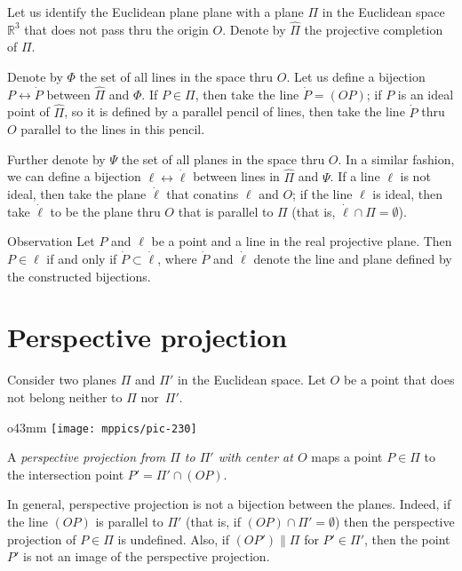 Let us identify the Euclidean plane plane with a plane $\Pi$ in the Euclidean space $\mathbb{R}^3$ that does not pass thru the origin $O$.
Denote by $\hat\Pi$ the projective completion of $\Pi$.

Denote by $\Phi$ the set of all lines in the space thru $O$.
Let us define a bijection $P\leftrightarrow \dot P$ between $\hat \Pi$ and $\Phi$.
If $P\in \Pi$, then take the line $\dot P=(OP)$;
if $P$ is an ideal point of $\hat \Pi$, so it is defined by a parallel pencil of lines, then take the line $\dot P$ thru $O$ parallel to the lines in this pencil.

Further denote by $\Psi$ the set of all planes in the space thru $O$.
In a similar fashion, we can define a bijection $\ell\leftrightarrow \dot \ell$ between lines in $\hat \Pi$ and $\Psi$.
If a line $\ell$ is not ideal, then take the plane  $\dot \ell$ that conatins $\ell$ and $O$;
if the line $\ell$ is ideal, then take $\dot \ell$ to be the plane thru $O$ that is parallel to $\Pi$ (that is, $\dot\ell\cap\Pi=\emptyset$).

\begin{thm}{Observation}\label{obs:bijections}
Let $P$ and $\ell$ be a point and a line in the real projective plane.
Then $P\in \ell$ if and only if $\dot P\subset \dot \ell$,
where $\dot P$ and $\dot \ell$ denote the line and plane defined by the constructed bijections.
\end{thm}

\section*{Perspective projection}

Consider two planes $\Pi$ and $\Pi'$ 
in the Euclidean space. 
Let $O$ be a point that does not belong neither to $\Pi$ nor~$\Pi'$.

\begin{wrapfigure}{o}{43mm}
\centering
\texttt{[image: mppics/pic-230]}
\end{wrapfigure}

A \emph{perspective projection from $\Pi$ to $\Pi'$ with center at $O$} maps a point $P\in \Pi$
to the intersection point $P'=\Pi'\cap (OP)$.

In general, perspective projection is not a bijection between the planes.
Indeed, if the line $(OP)$ is parallel to $\Pi'$ 
(that is, if $(OP)\cap\Pi'=\emptyset$)
then the perspective projection of $P\in \Pi$ is undefined.
Also, if $(OP')\parallel \Pi$ 
for $P'\in \Pi'$,
then the point $P'$ is not an image of the perspective projection.

